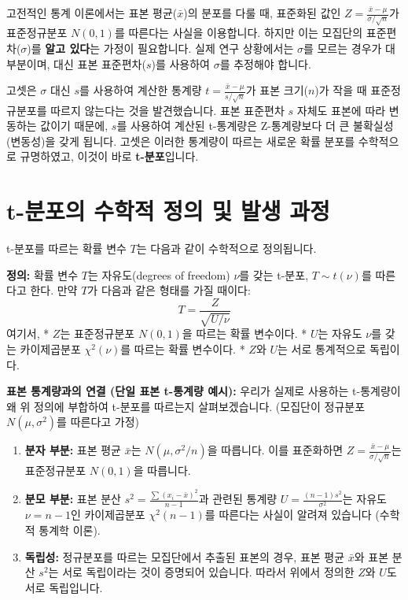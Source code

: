 \documentclass[
  letterpaper,
]{book}
\providecommand{\tightlist}{%
  \setlength{\itemsep}{0pt}\setlength{\parskip}{0pt}}
\begin{document}
고전적인 통계 이론에서는 표본 평균(\(\bar{x}\))의 분포를 다룰 때,
표준화된 값인 \(Z = \frac{\bar{x} - \mu}{\sigma/\sqrt{n}}\)가
표준정규분포 \(N(0, 1)\)를 따른다는 사실을 이용합니다. 하지만 이는
모집단의 표준편차(\(\sigma\))를 \textbf{알고 있다}는 가정이 필요합니다.
실제 연구 상황에서는 \(\sigma\)를 모르는 경우가 대부분이며, 대신 표본
표준편차(\(s\))를 사용하여 \(\sigma\)를 추정해야 합니다.

고셋은 \(\sigma\) 대신 \(s\)를 사용하여 계산한 통계량
\(t = \frac{\bar{x} - \mu}{s/\sqrt{n}}\)가 표본 크기(\(n\))가 작을 때
표준정규분포를 따르지 않는다는 것을 발견했습니다. 표본 표준편차 \(s\)
자체도 표본에 따라 변동하는 값이기 때문에, \(s\)를 사용하여 계산된
t-통계량은 Z-통계량보다 더 큰 불확실성(변동성)을 갖게 됩니다. 고셋은
이러한 통계량이 따르는 새로운 확률 분포를 수학적으로 규명하였고, 이것이
바로 \textbf{t-분포}입니다.

\chapter{t-분포의 수학적 정의 및 발생
과정}\label{t-uxbd84uxd3ecuxc758-uxc218uxd559uxc801-uxc815uxc758-uxbc0f-uxbc1cuxc0dd-uxacfcuxc815}

t-분포를 따르는 확률 변수 \(T\)는 다음과 같이 수학적으로 정의됩니다.

\textbf{정의:} 확률 변수 \(T\)는 자유도(degrees of freedom) \(\nu\)를
갖는 t-분포, \(T \sim t(\nu)\)를 따른다고 한다. 만약 \(T\)가 다음과 같은
형태를 가질 때이다: \[T = \frac{Z}{\sqrt{U/\nu}}\] 여기서, * \(Z\)는
표준정규분포 \(N(0, 1)\)을 따르는 확률 변수이다. * \(U\)는 자유도
\(\nu\)를 갖는 카이제곱분포 \(\chi^2(\nu)\)를 따르는 확률 변수이다. *
\(Z\)와 \(U\)는 서로 통계적으로 독립이다.

\textbf{표본 통계량과의 연결 (단일 표본 t-통계량 예시):} 우리가 실제로
사용하는 t-통계량이 왜 위 정의에 부합하여 t-분포를 따르는지
살펴보겠습니다. (모집단이 정규분포 \(N(\mu, \sigma^2)\)를 따른다고 가정)

\begin{enumerate}
\def\labelenumi{\arabic{enumi}.}
\tightlist
\item
  \textbf{분자 부분:} 표본 평균 \(\bar{x}\)는 \(N(\mu, \sigma^2/n)\)을
  따릅니다. 이를 표준화하면
  \(Z = \frac{\bar{x} - \mu}{\sigma/\sqrt{n}}\)는 표준정규분포
  \(N(0, 1)\)을 따릅니다.
\item
  \textbf{분모 부분:} 표본 분산
  \(s^2 = \frac{\sum(x_i - \bar{x})^2}{n-1}\)과 관련된 통계량
  \(U = \frac{(n-1)s^2}{\sigma^2}\)는 자유도 \(\nu = n-1\)인
  카이제곱분포 \(\chi^2(n-1)\)를 따른다는 사실이 알려져 있습니다 (수학적
  통계학 이론).
\item
  \textbf{독립성:} 정규분포를 따르는 모집단에서 추출된 표본의 경우, 표본
  평균 \(\bar{x}\)와 표본 분산 \(s^2\)는 서로 독립이라는 것이 증명되어
  있습니다. 따라서 위에서 정의한 \(Z\)와 \(U\)도 서로 독립입니다.
\end{enumerate}
\end{document}
